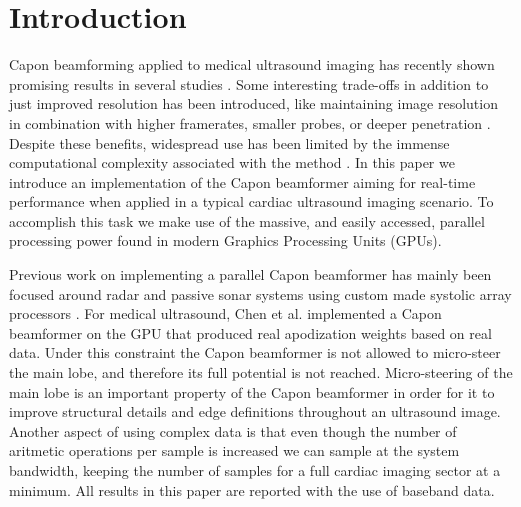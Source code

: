 \documentclass[conference]{IEEEtran}
\begin{document}
\section{Introduction}
Capon beamforming \cite{Capon1969} applied to medical ultrasound imaging has recently shown promising results in several studies \cite{Synnevag2007, Austeng2008, Vignon2008, Viola, Mehdizadeh2012}. Some interesting trade-offs in addition to just improved resolution has been introduced, like maintaining image resolution in combination with higher framerates, smaller probes, or deeper penetration \cite{Synnevag2009}. Despite these benefits, widespread use has been limited by the immense computational complexity associated with the method \cite{So2011}.  In this paper we introduce an implementation of the Capon beamformer aiming for real-time performance when applied in a typical cardiac ultrasound imaging scenario. To accomplish this task we make use of the massive, and easily accessed, parallel processing power found in modern Graphics Processing Units (GPUs). 

Previous work on implementing a parallel Capon beamformer has mainly been focused around radar and passive sonar systems using custom made systolic array processors \cite{McWhirter1989, Sinha2002}. For medical ultrasound, Chen et al. \cite{Chen2011a, Chen2011} implemented a Capon beamformer on the GPU that produced real apodization weights based on real data. Under this constraint the Capon beamformer is not allowed to micro-steer the main lobe, and therefore its full potential is not reached. Micro-steering of the main lobe is an important property of the Capon beamformer in order for it to improve structural details and edge definitions throughout an ultrasound image. Another aspect of using complex data is that even though the number of aritmetic operations per sample is increased we can sample at the system bandwidth, keeping the number of samples for a full cardiac imaging sector at a minimum. All results in this paper are reported with the use of baseband data.

\end{document}
